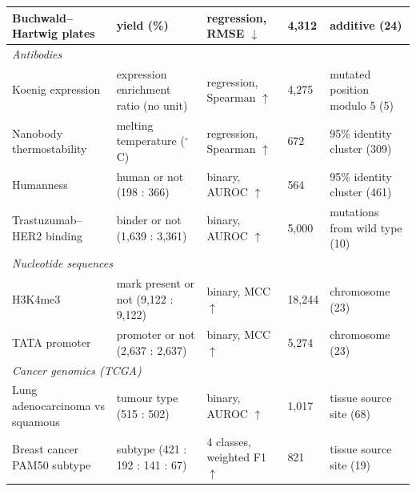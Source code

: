 \begin{table}[htbp]
\begin{tabular}{p{3.0cm}p{3.3cm}p{2.3cm}p{1.1cm}p{3.5cm}}
Buchwald--Hartwig plates \citep{Ahneman2018} & yield (\%) & regression, RMSE $\downarrow$ & 4,312 & additive (24) \\
\midrule
\multicolumn{5}{l}{\textit{Antibodies}} \\
Koenig expression \citep{Koenig2017, Chungyoun2024} & expression enrichment ratio (no unit) & regression, Spearman $\uparrow$ & 4,275 & mutated position modulo 5 (5) \\
Nanobody thermostability \citep{ValdesTresanco2023, Chungyoun2024} & melting temperature ($^\circ$C) & regression, Spearman $\uparrow$ & 672 & 95\% identity cluster (309) \\
Humanness \citep{Prihoda2022} & human or not (198 : 366) & binary, AUROC $\uparrow$ & 564 & 95\% identity cluster (461) \\
Trastuzumab--HER2 binding \citep{Chinery2024} & binder or not (1,639 : 3,361) & binary, AUROC $\uparrow$ & 5,000 & mutations from wild type (10) \\
\midrule
\multicolumn{5}{l}{\textit{Nucleotide sequences}} \\
H3K4me3 \citep{DallaTorre2025} & mark present or not (9,122 : 9,122) & binary, MCC $\uparrow$ & 18,244 & chromosome (23) \\
TATA promoter \citep{DallaTorre2025} & promoter or not (2,637 : 2,637) & binary, MCC $\uparrow$ & 5,274 & chromosome (23) \\
\midrule
\multicolumn{5}{l}{\textit{Cancer genomics (TCGA)}} \\
Lung adenocarcinoma vs squamous \citep{TCGA2014LUAD, TCGA2012LUSC, Goldman2020} & tumour type (515 : 502) & binary, AUROC $\uparrow$ & 1,017 & tissue source site (68) \\
Breast cancer PAM50 subtype \citep{TCGA2012BRCA, Parker2009, Goldman2020} & subtype (421 : 192 : 141 : 67) & 4 classes, weighted F1 $\uparrow$ & 821 & tissue source site (19) \\
\bottomrule
\end{tabular}
\end{table}

